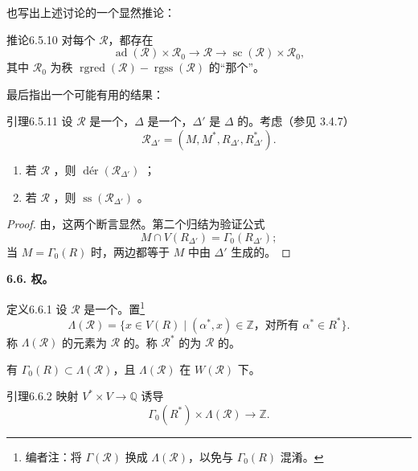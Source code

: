 也写出上述讨论的一个显然推论：
\begin{SGAresult}{推论}{6.5.10}
对每个 $\mathscr R$，都存在
\[\operatorname{ad}(\mathscr R)\times\mathscr R_0\longrightarrow\mathscr R\longrightarrow\operatorname{sc}(\mathscr R)\times\mathscr R_0,\]
其中 $\mathscr R_0$ 为秩 $\operatorname{rgred}(\mathscr R)-\operatorname{rgss}(\mathscr R)$ 的“那个”。
\end{SGAresult}
最后指出一个可能有用的结果：
\begin{SGAresult}{引理}{6.5.11}
设 $\mathscr R$ 是一个，$\Delta$ 是一个，$\Delta'$ 是 $\Delta$ 的。考虑（参见 3.4.7）
\[\mathscr R_{\Delta'}=(M,M^*,R_{\Delta'},R_{\Delta'}^*).\]
\begin{enumerate}
\item[(i)] 若 $\mathscr R$ ，则 $\operatorname{d\text{é}r}(\mathscr R_{\Delta'})$ ；
\item[(ii)] 若 $\mathscr R$ ，则 $\operatorname{ss}(\mathscr R_{\Delta'})$ 。
\end{enumerate}
\end{SGAresult}
\begin{proof}
由，这两个断言显然。第二个归结为验证公式
\[M\cap V(R_{\Delta'})=\Gamma_0(R_{\Delta'});\]
当 $M=\Gamma_0(R)$ 时，两边都等于 $M$ 中由 $\Delta'$ 生成的。
\end{proof}
\textbf{6.6. 权。}
\begin{SGAresult}{定义}{6.6.1}
设 $\mathscr R$ 是一个。置\footnote{编者注：将 $\Gamma(\mathscr R)$ 换成 $\Lambda(\mathscr R)$，以免与 $\Gamma_0(R)$ 混淆。}
\[\Lambda(\mathscr R)=\{x\in V(R)\mid(\alpha^*,x)\in\mathbb Z\text{，对所有 }\alpha^*\in R^*\}.\]
称 $\Lambda(\mathscr R)$ 的元素为 $\mathscr R$ 的。称 $\mathscr R^*$ 的为 $\mathscr R$ 的。
\end{SGAresult}
有 $\Gamma_0(R)\subset\Lambda(\mathscr R)$，且 $\Lambda(\mathscr R)$ 在 $W(\mathscr R)$ 下。
\begin{SGAresult}{引理}{6.6.2}
映射 $V^*\times V\to\mathbb Q$ 诱导
\[\Gamma_0(R^*)\times\Lambda(\mathscr R)\longrightarrow\mathbb Z.\]
\end{SGAresult}

